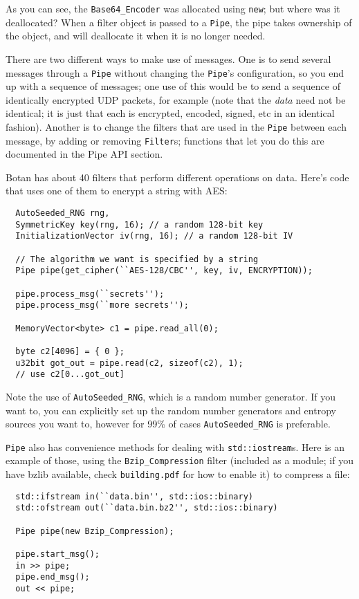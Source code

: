 \documentclass{article}
\newcommand{\filename}[1]{\texttt{#1}}
\newcommand{\keyword}[1]{\texttt{#1}}
\newcommand{\type}[1]{\texttt{#1}}
\begin{document}
As you can see, the \type{Base64\_Encoder} was allocated using
\keyword{new}; but where was it deallocated? When a filter object is
passed to a \type{Pipe}, the pipe takes ownership of the object, and
will deallocate it when it is no longer needed.

There are two different ways to make use of messages. One is to send
several messages through a \type{Pipe} without changing the
\type{Pipe}'s configuration, so you end up with a sequence of
messages; one use of this would be to send a sequence of identically
encrypted UDP packets, for example (note that the \emph{data} need not
be identical; it is just that each is encrypted, encoded, signed, etc
in an identical fashion). Another is to change the filters that are
used in the \type{Pipe} between each message, by adding or removing
\type{Filter}s; functions that let you do this are documented in the
Pipe API section.

Botan has about 40 filters that perform different operations on data.
Here's code that uses one of them to encrypt a string with AES:

\begin{verbatim}
  AutoSeeded_RNG rng,
  SymmetricKey key(rng, 16); // a random 128-bit key
  InitializationVector iv(rng, 16); // a random 128-bit IV

  // The algorithm we want is specified by a string
  Pipe pipe(get_cipher(``AES-128/CBC'', key, iv, ENCRYPTION));

  pipe.process_msg(``secrets'');
  pipe.process_msg(``more secrets'');

  MemoryVector<byte> c1 = pipe.read_all(0);

  byte c2[4096] = { 0 };
  u32bit got_out = pipe.read(c2, sizeof(c2), 1);
  // use c2[0...got_out]
\end{verbatim}

Note the use of \type{AutoSeeded\_RNG}, which is a random number
generator. If you want to, you can explicitly set up the random number
generators and entropy sources you want to, however for 99\% of cases
\type{AutoSeeded\_RNG} is preferable.

\type{Pipe} also has convenience methods for dealing with
\type{std::iostream}s. Here is an example of those, using the
\type{Bzip\_Compression} filter (included as a module; if you have
bzlib available, check \filename{building.pdf} for how to enable it)
to compress a file:

\begin{verbatim}
  std::ifstream in(``data.bin'', std::ios::binary)
  std::ofstream out(``data.bin.bz2'', std::ios::binary)

  Pipe pipe(new Bzip_Compression);

  pipe.start_msg();
  in >> pipe;
  pipe.end_msg();
  out << pipe;
\end{verbatim}
\end{document}
